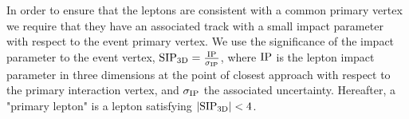  In order to ensure that the leptons are consistent with a common primary vertex we require that they have an associated track with a small impact parameter with respect to the event primary vertex.  
We use the significance of the impact parameter to the event vertex, $  {\rm SIP_{3D}} = \frac{\rm IP}{\sigma_{\rm IP}} $, where ${\rm IP}$ is the lepton impact parameter in three dimensions at the point of closest approach with respect to the primary interaction vertex, and $\sigma_{\rm IP}$ the associated uncertainty.  Hereafter, a "primary lepton" is a lepton satisfying $| {\rm SIP_{3D}} | < 4$.               
